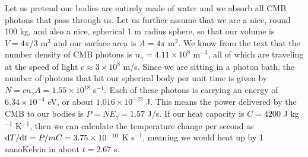 \documentclass[12pt,a4paper]{article}
\begin{document}
Let us pretend our bodies are entirely made of water and we absorb all CMB photons that pass through us. Let us further assume that we are a nice, round 100 kg, and also a nice, spherical 1 m radius sphere, so that our volume is $V=4\pi/3$ m$^{3}$ and our surface area is $A=4\pi$ m$^{2}$. We know from the text that the number density of CMB photons is $n_\gamma = 4.11\times 10^{8}$ m$^{-3}$, all of which are traveling at the speed of light $c\approx 3\times 10^8$ m/s. Since we are sitting in a photon bath, the number of photons that hit our spherical body per unit time is given by $N = cn_\gamma A = 1.55\times 10^{18}$ s$^{-1}$. Each of these photons is carrying an energy of $6.34\times10^{-4}$ eV, or about $1.016\times10^{-22}$ J. This means the power delivered by the CMB to our bodies is $P = NE_\gamma = 1.57$ J/s. If our heat capacity is $C = 4200$ J kg$^{-1}$ K$^{-1}$, then we can calculate the temperature change per second as ${\rm d}T/{\rm d}t = P/mC = 3.75\times 10^{-10}$ K s$^{-1}$, meaning we would heat up by 1 nanoKelvin in about $t= 2.67$ s.
\end{document}
